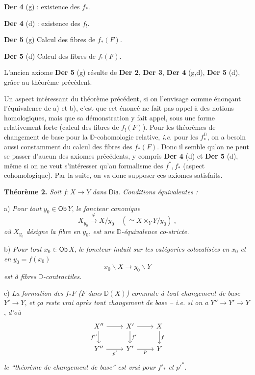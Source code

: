 \documentclass[11pt]{article}
\newcommand{\printedpage}[1]{\marginpar{\footnotesize p.~#1}}
\newcommand{\msp}[1]{\marginpar{\footnotesize [#1]}}
\newcommand{\D}{\mathbb{D}}
\newcommand{\Dia}{\mathsf{Dia}}
\newcommand{\Ob}{\mathsf{Ob}}
\begin{document}
\printedpage{40}
\msp{page 68}

\noindent\textbf{Der 4} (g) : existence des $f_*$.

\noindent\textbf{Der 4} (d) : existence des $f_!$.

\noindent\textbf{Der 5} (g) Calcul des fibres de $f_*(F)$.

\noindent\textbf{Der 5} (d) Calcul des fibres de $f_!(F)$.

\noindent L'ancien axiome \textbf{Der 5} (g) résulte de \textbf{Der 2}, \textbf{Der 3}, \textbf{Der 4} (g,d), \textbf{Der 5} (d), grâce au théorème précédent.

Un aspect intéressant du théorème précédent, si on l'envisage comme énonçant l'équivalence de a) et b), c'est que cet énoncé ne fait pas appel à des notions homologiques, mais que sa démonstration y fait appel, sous une forme relativement forte (calcul des fibres de $f_!(F)$). Pour les théorèmes de changement de base pour la $\D$-cohomologie relative, \textit{i.e.} pour les $f_*^{\D}$, on a besoin aussi constamment du calcul des fibres des $f_*(F)$. Donc il semble qu'on ne peut se passer d'aucun des axiomes précédents, y compris \textbf{Der 4} (d) et \textbf{Der 5} (d), même si on ne veut s'intéresser qu'au formalisme des $f^*, f_*$ (aspect cohomologique). Par la suite, on va donc supposer ces axiomes satisfaits.

\noindent\textbf{Théorème 2.} \textit{Soit} $f : X \to Y$ \textit{dans} $\Dia$. \textit{Conditions équivalentes :}

a) \textit{Pour tout} $y_0 \in \Ob\, Y$, \textit{le foncteur canonique}
\[
X_{y_0} \overset{\varphi}{\longrightarrow} X/y_0 \quad (\simeq X \times_Y Y/y_0) \ ,
\]
\textit{où} $X_{y_0}$ \textit{désigne la fibre en} $y_0$, \textit{est une} $\D$\textit{-équivalence co-stricte.}

b) \textit{Pour tout} $x_0 \in \Ob\, X$, \textit{le foncteur induit sur les catégories colocalisées en} $x_0$ \textit{et en} $y_0 = f(x_0)$
\[
x_0\backslash X \longrightarrow y_0\backslash Y
\]
\textit{est à fibres} $\D$\textit{-contractiles.}

\msp{page 69}

c) \textit{La formation des} $f_*F$ \textit{(}$F$ \textit{dans} $\D(X)$\textit{) commute à tout changement de base} $Y' \to Y$, \textit{et ça reste vrai après tout changement de base -- i.e. si on a} $Y'' \to Y' \to Y$, \textit{d'où}
\[
\begin{tikzcd}
X'' \arrow[r] \arrow[d, "f''"{swap}] & X' \arrow[r] \arrow[d, "f'"] & X \arrow[d, "f"] \\
Y'' \arrow[r, "p'"{swap}] & Y' \arrow[r, "p"{swap}] & Y
\end{tikzcd}
\]
\textit{le “théorème de changement de base” est vrai pour} $f'_*$ \textit{et} $p'^{*}$.
\end{document}
